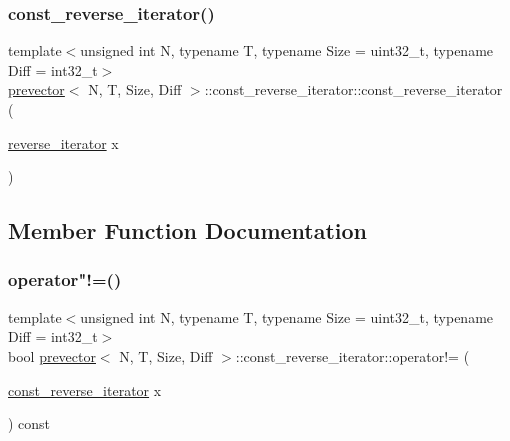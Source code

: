 \subsubsection{\texorpdfstring{const\+\_\+reverse\+\_\+iterator()}{const\_reverse\_iterator()}\hspace{0.1cm}{\footnotesize\ttfamily [2/2]}}
{\footnotesize\ttfamily template$<$unsigned int N, typename T, typename Size = uint32\+\_\+t, typename Diff = int32\+\_\+t$>$ \\
\mbox{\hyperlink{classprevector}{prevector}}$<$ N, T, Size, Diff $>$\+::const\+\_\+reverse\+\_\+iterator\+::const\+\_\+reverse\+\_\+iterator (\begin{DoxyParamCaption}\item[{\mbox{\hyperlink{classprevector_1_1reverse__iterator}{reverse\+\_\+iterator}}}]{x }\end{DoxyParamCaption})\hspace{0.3cm}{\ttfamily [inline]}}



\subsection{Member Function Documentation}
\mbox{\label{classprevector_1_1const__reverse__iterator_ad1da739c0adfa0624b3c99161ad46810}} 
\subsubsection{\texorpdfstring{operator"!=()}{operator!=()}}
{\footnotesize\ttfamily template$<$unsigned int N, typename T, typename Size = uint32\+\_\+t, typename Diff = int32\+\_\+t$>$ \\
bool \mbox{\hyperlink{classprevector}{prevector}}$<$ N, T, Size, Diff $>$\+::const\+\_\+reverse\+\_\+iterator\+::operator!= (\begin{DoxyParamCaption}\item[{\mbox{\hyperlink{classprevector_1_1const__reverse__iterator}{const\+\_\+reverse\+\_\+iterator}}}]{x }\end{DoxyParamCaption}) const\hspace{0.3cm}{\ttfamily [inline]}}

